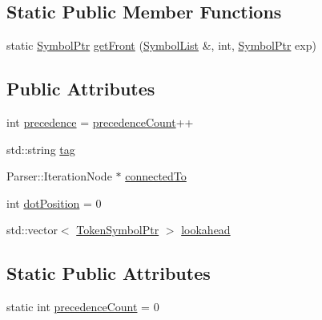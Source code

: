 \subsection*{Static Public Member Functions}
\begin{DoxyCompactItemize}
\item 
static \mbox{\hyperlink{namespace_erable_1_1_compiler_1_1_symbols_a8f0bc762f448ea4d84e8713ab3e140b9}{Symbol\+Ptr}} \mbox{\hyperlink{class_erable_1_1_compiler_1_1_symbols_1_1_symbol_a8569f1b7eabd7e4ab3322aef8f79cf93}{get\+Front}} (\mbox{\hyperlink{namespace_erable_1_1_compiler_1_1_symbols_a63e8157d2f729d4689d27bacad42f8ed}{Symbol\+List}} \&, int, \mbox{\hyperlink{namespace_erable_1_1_compiler_1_1_symbols_a8f0bc762f448ea4d84e8713ab3e140b9}{Symbol\+Ptr}} exp)
\end{DoxyCompactItemize}
\subsection*{Public Attributes}
\begin{DoxyCompactItemize}
\item 
int \mbox{\hyperlink{class_erable_1_1_compiler_1_1_symbols_1_1_symbol_aedf7c04582d9fdfdb5a34bc07c6927f9}{precedence}} = \mbox{\hyperlink{class_erable_1_1_compiler_1_1_symbols_1_1_symbol_ac6f3cb75bf61e07c1ff1e7f236d6d1ac}{precedence\+Count}}++
\item 
std\+::string \mbox{\hyperlink{class_erable_1_1_compiler_1_1_symbols_1_1_symbol_a09df8dce9bee3576451b880fc651506d}{tag}}
\item 
Parser\+::\+Iteration\+Node $\ast$ \mbox{\hyperlink{class_erable_1_1_compiler_1_1_symbols_1_1_symbol_a8fcbecdc112fd91cfec407895a0783ae}{connected\+To}}
\item 
int \mbox{\hyperlink{class_erable_1_1_compiler_1_1_symbols_1_1_symbol_abf7b881e0a9da479710cdb29133a8936}{dot\+Position}} = 0
\item 
std\+::vector$<$ \mbox{\hyperlink{namespace_erable_1_1_compiler_1_1_symbols_a901387d440ee00c2282850e615ff8ffa}{Token\+Symbol\+Ptr}} $>$ \mbox{\hyperlink{class_erable_1_1_compiler_1_1_symbols_1_1_symbol_a2bd051acb63478230c3ce73a7c19a315}{lookahead}}
\end{DoxyCompactItemize}
\subsection*{Static Public Attributes}
\begin{DoxyCompactItemize}
\item 
static int \mbox{\hyperlink{class_erable_1_1_compiler_1_1_symbols_1_1_symbol_ac6f3cb75bf61e07c1ff1e7f236d6d1ac}{precedence\+Count}} = 0
\end{DoxyCompactItemize}



